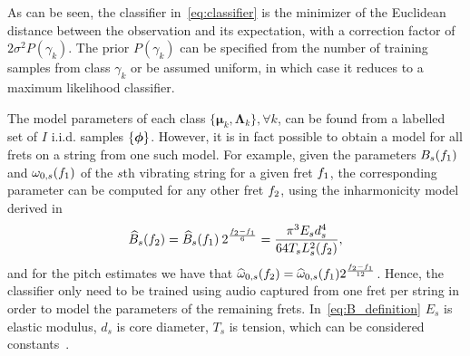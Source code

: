 \documentclass{article}
\begin{document}
As can be seen, the classifier in~\eqref{eq:classifier} is the minimizer of the Euclidean distance between the observation and its expectation, with a correction factor of $2\sigma^2 P(\gamma_k)$. The prior $P(\gamma_k)$ can be specified from the number of training samples from class $\gamma_k$ or be assumed uniform, in which case it reduces to a maximum likelihood classifier. 
%
%
%
%
%
%

The model parameters of each class $\{\boldsymbol{\mu}_k, \boldsymbol{\Lambda}_k\}, \forall k$, can be found from a labelled set of $I$ i.i.d. samples $\{\text{\boldmath$\phi$}\}$. %
However, it is in fact possible to obtain a model for all frets on a string from one such model. For example, given the parameters $B_s( f_1 )$ and $\omega_{0,s}( f_1 )$ of the $s$th vibrating string for a given fret $f_1$, the corresponding parameter can be computed for any other fret $f_2$, using the inharmonicity model derived in~\cite{barbancho:inharmonicity_tablature}
\begin{equation}\label{eq:B_definition}
    \widehat{B}_s( f_2 ) =  \widehat{B}_s( f_1 ) \: 2^{ \frac{  f_2 - f_1 }{ 6 }} = \frac{ \pi^3 E_s d_s^4 }{ 64 T_s L^2_{s}(f_2) },
\end{equation}
and for the pitch estimates we have that
  $\widehat{\omega}_{0,s}( f_2 ) =  \widehat{\omega}_{0,s}( f_1 ) 2^{\frac{f_2-f_1}{12}}$.
Hence, the classifier only need to be trained using audio captured from one fret per string in order to model the parameters of the remaining frets. In~\eqref{eq:B_definition} $E_s$ is elastic modulus, $d_s$ is core diameter, $T_s$ is tension, which can be considered constants~\cite{rossing:science_of_string_instruments}. %
\vspace{-.8mm}
\end{document}
